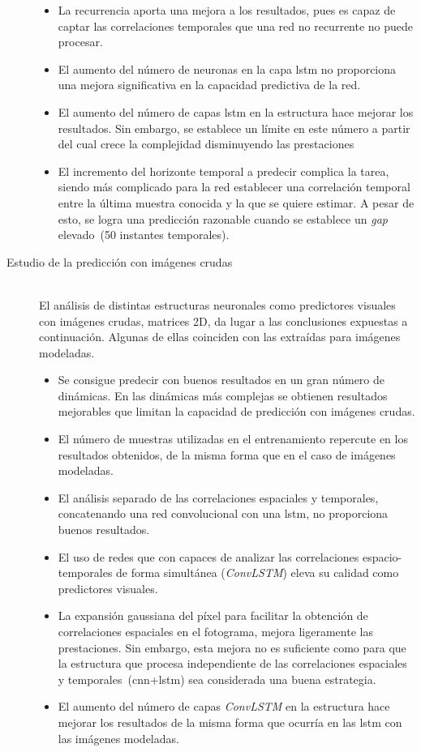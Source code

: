\begin{description}
\begin{itemize}
	    \item La recurrencia aporta una mejora a los resultados, pues es capaz de captar las correlaciones temporales que una red no recurrente no puede procesar.
	    \item El aumento del número de neuronas en la capa \acrshort{lstm} no proporciona una mejora significativa en la capacidad predictiva de la red.
	    \item El aumento del número de capas \acrshort{lstm} en la estructura hace mejorar los resultados. Sin embargo, se establece un límite en este número a partir del cual crece la complejidad disminuyendo las prestaciones 
	    \item El incremento del horizonte temporal a predecir complica la tarea, siendo  más complicado para la red establecer una correlación temporal entre la última muestra conocida y la que se quiere estimar. A pesar de esto, se logra una predicción razonable cuando se establece un \textit{gap} elevado~(50 instantes temporales).
	\end{itemize}
	\item[Estudio de la predicción con imágenes crudas] 
	\hfill 
	\vspace{5pt}
	\\
    El análisis de distintas estructuras neuronales como predictores visuales con imágenes crudas, matrices 2D, da lugar a las conclusiones expuestas a continuación. Algunas de ellas coinciden con las extraídas para imágenes modeladas.
	\begin{itemize}
	    \item Se consigue predecir con buenos resultados en un gran número de dinámicas. En las dinámicas más complejas se obtienen resultados mejorables que limitan la capacidad de predicción con imágenes crudas.
	    \item El número de muestras utilizadas en el entrenamiento repercute en los resultados obtenidos, de la misma forma que en el caso de imágenes modeladas.
	    \item El análisis separado de las correlaciones espaciales y temporales, concatenando una red convolucional con una \acrshort{lstm}, no proporciona buenos resultados.
	    \item El uso de redes que con capaces de analizar las correlaciones espacio-temporales de forma simultánea (\textit{ConvLSTM}) eleva su calidad como predictores visuales.
	    \item La expansión gaussiana del píxel para facilitar la obtención de correlaciones espaciales en el fotograma, mejora ligeramente las prestaciones. Sin embargo, esta mejora no es suficiente como para que la estructura que procesa independiente de las correlaciones espaciales y temporales~(\acrshort{cnn}+\acrshort{lstm}) sea considerada una buena estrategia.
	    \item El aumento del número de capas \textit{ConvLSTM} en la estructura hace mejorar los resultados de la misma forma que ocurría en las \acrshort{lstm} con las imágenes modeladas.
    \end{itemize}
\end{description}

